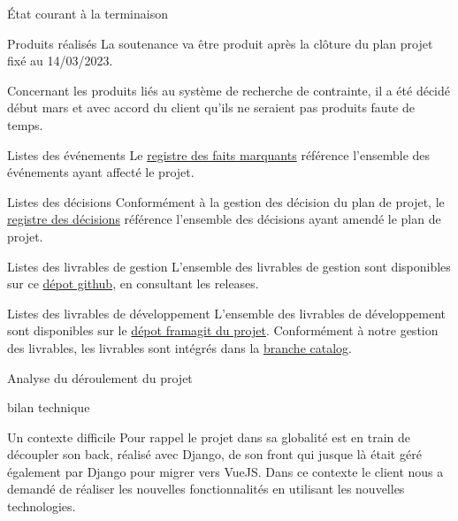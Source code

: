\documentclass[]{article}
\begin{document}
{\begin{section}{État courant à la terminaison}
\begin{subsection}{Produits réalisés}
     La soutenance va être produit après la clôture du plan projet fixé au 14/03/2023.

     Concernant les produits liés au système de recherche de contrainte, il a été décidé début mars et avec accord du client qu’ils ne seraient pas produits faute de temps.
 \end{subsection}

 \begin{subsection}{Listes des événements}
     Le \href{Registre_des_faits_marquants.pdf}{registre des faits marquants} référence l'ensemble des événements ayant affecté le projet.
 \end{subsection}

 \begin{subsection}{Listes des décisions}
     Conformément à la gestion des décision du plan de projet, le \href{Registre_des_décisions.pdf}{registre des décisions} référence l'ensemble des décisions ayant amendé le plan de projet.
 \end{subsection}

 \begin{subsection}{Listes des livrables de gestion}
     L'ensemble des livrables de gestion sont disponibles sur ce \href{https://github.com/Szyckaa/UE-PROJET-DOCS-GESTION}{dépot github}, en consultant les releases.
 \end{subsection}

 \begin{subsection}{Listes des livrables de développement}
     L'ensemble des livrables de développement sont disponibles sur le \href{https://framagit.org/flopedt/FlOpEDT}{dépot framagit du projet}. Conformément à notre gestion des livrables, les livrables sont intégrés dans la \href{https://framagit.org/flopedt/FlOpEDT/-/tree/catalog}{branche catalog}.
 \end{subsection}
\end{section}

\begin{section}{Analyse du déroulement du projet}
 \begin{subsection}{bilan technique}
     \begin{subsubsection}{Un contexte difficile}
         Pour rappel le projet dans sa globalité est en train de découpler son back, réalisé avec Django, de son front qui jusque là était géré également par Django pour migrer vers VueJS. Dans ce contexte le client nous a demandé de réaliser les nouvelles fonctionnalités en utilisant les nouvelles technologies.


\end{subsubsection}
\end{subsection}
\end{section}}
\end{document}
